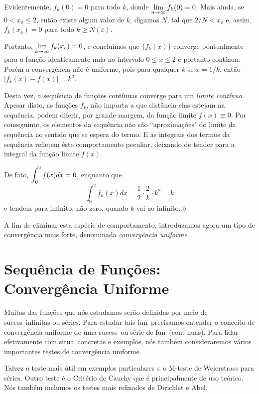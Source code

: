 \solo Evidentemente, $f_k(0)= 0$ para todo $k$, donde
$\displaystyle{\lim_{n\to\infty}f_k(0) = 0}$. Mais ainda, se $0 < x_o\leq
2$, então existe algum valor de $k$, digamos $N$, tal que $2/N <
x_o$ e, assim, $f_k(x_o) = 0$ para todo $k \geq N(\varepsilon)$.

Portanto, $\displaystyle{\lim_{k\to\infty} f_k(x_o) = 0}$, e concluímos que
$\{f_k(x)\}$ converge pontualmente para a função identicamente
nula no intervalo $0\leq x \leq 2$ e portanto contínua. Porém a
convergência não é uniforme, pois para qualquer $k$ se $x=1/k$,
então $|f_k(x)-f(x)|=k^2$.

Desta vez, a sequência de funções contínuas converge para um
\textit{limite contínuo}. Apesar disto, as funções $f_k$, não
importa a que distância elas estejam na sequência, podem diferir,
por grande margem, da função limite $f(x)\equiv 0$. Por
conseguinte, os elementos da sequência não são ``aproximações"\;
do limite da sequência no sentido que se espera do termo. E as
integrais dos termos da sequência refletem êste comportamento
peculiar, deixando de tender para a integral da função limite
$f(x)$.

De fato, $\displaystyle{\int_0^2f(x)dx = 0}$, enquanto que
\begin{equation*}
  \int_0^2f_k(x)dx =\frac{1}{2}\cdot\frac{2}{k}\cdot k^2=k
\end{equation*}
e tendem para infinito, não-zero, quando $k$ vai ao infinito.\hfill \(\lozenge\)

A fim de eliminar esta espécie de comportamento, introduzamos
agora um tipo de convergência mais forte, denominada
\textit{convergência uniforme}.

\section{Sequência de Funções: Convergência Uniforme}

Muitas das fun\c c\~oes que n\'os estudamos serão definidas por
meio de sucess\oes\ infinitas ou s\'eries. Para estudar tais
fun\coes\ precisamos entender o conceito de converg\^encia
uniforme de uma sucess\ao\ ou s\'erie de  fun\coes\ (cont\ii
nuas). Para lidar efetivamente com situa\coes\ concretas e
exemplos, nós também consideraremos v\'arios importantes testes de
converg\^encia uniforme.

Talvez o teste mais \'util em exemplos particulares s\ao\ o
M-teste de Weierstrass para s\'eries. Outro teste \'e o Critério
de Cauchy que \'e principalmente de uso te\'orico. N\'os tamb\'em
inclu\ii mos os testes mais refinados de Dirichlet e Abel.


